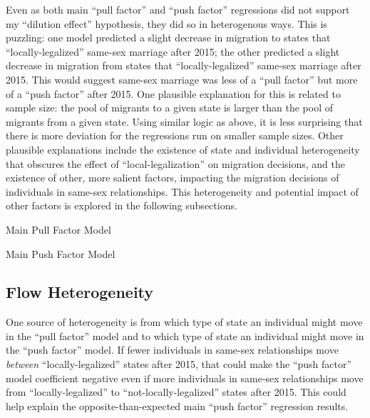 \documentclass[12pt,letterpaper]{article}
\begin{document}
Even as both main “pull factor” and “push factor”  regressions did not support my “dilution effect” hypothesis, they did so in heterogenous ways. This is puzzling: one model predicted a slight decrease in migration to states that “locally-legalized” same-sex marriage after 2015; the other predicted a slight decrease in migration from states that “locally-legalized” same-sex marriage after 2015. This would suggest same-sex marriage was less of a “pull factor” but more of a “push factor” after 2015. One plausible explanation for this is related to sample size: the pool of migrants to a given state is larger than the pool of migrants from a given state. Using similar logic as above, it is less surprising that there is more deviation for the regressions run on smaller sample sizes. Other plausible explanations include the existence of state and individual heterogeneity that obscures the effect of “local-legalization” on migration decisions, and the existence of other, more salient factors, impacting the migration decisions of individuals in same-sex relationships. This heterogeneity and potential impact of other factors is explored in the following subsections. 

\begin{table}[h]
    \centering
    \caption{Main Pull Factor Model}
    \label{tab: expost_model}
    
\end{table}
\begin{table}[h]
    \centering
    \caption{Main Push Factor Model}
    \label{tab: exante_model}
    
\end{table}

\clearpage
\subsection{Flow Heterogeneity}

One source of heterogeneity is from which type of state an individual might move in the “pull factor” model and to which type of state an individual might move in the “push factor” model. If fewer individuals in same-sex relationships move \textit{between} “locally-legalized” states after 2015, that could make the “push factor” model coefficient negative even if more individuals in same-sex relationships move from “locally-legalized” to “not-locally-legalized” states after 2015. This could help explain the opposite-than-expected main “push factor” regression results.
\end{document}
